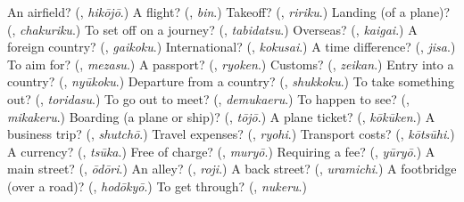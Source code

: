 \begin{tcolorbox}[breakable,colback=teal!4,colframe=teal!35!black,title={Before you move on}]
An airfield? (\textbf{}, \emph{hikōjō}.) A flight? (\textbf{}, \emph{bin}.) Takeoff? (\textbf{}, \emph{ririku}.) Landing (of a plane)? (\textbf{}, \emph{chakuriku}.) To set off on a journey? (\textbf{}, \emph{tabidatsu}.) Overseas? (\textbf{}, \emph{kaigai}.) A foreign country? (\textbf{}, \emph{gaikoku}.) International? (\textbf{}, \emph{kokusai}.) A time difference? (\textbf{}, \emph{jisa}.) To aim for? (\textbf{}, \emph{mezasu}.) A passport? (\textbf{}, \emph{ryoken}.) Customs? (\textbf{}, \emph{zeikan}.) Entry into a country? (\textbf{}, \emph{nyūkoku}.) Departure from a country? (\textbf{}, \emph{shukkoku}.) To take something out? (\textbf{}, \emph{toridasu}.) To go out to meet? (\textbf{}, \emph{demukaeru}.) To happen to see? (\textbf{}, \emph{mikakeru}.) Boarding (a plane or ship)? (\textbf{}, \emph{tōjō}.) A plane ticket? (\textbf{}, \emph{kōkūken}.) A business trip? (\textbf{}, \emph{shutchō}.) Travel expenses? (\textbf{}, \emph{ryohi}.) Transport costs? (\textbf{}, \emph{kōtsūhi}.) A currency? (\textbf{}, \emph{tsūka}.) Free of charge? (\textbf{}, \emph{muryō}.) Requiring a fee? (\textbf{}, \emph{yūryō}.) A main street? (\textbf{}, \emph{ōdōri}.) An alley? (\textbf{}, \emph{roji}.) A back street? (\textbf{}, \emph{uramichi}.) A footbridge (over a road)? (\textbf{}, \emph{hodōkyō}.) To get through? (\textbf{}, \emph{nukeru}.)
\end{tcolorbox}
